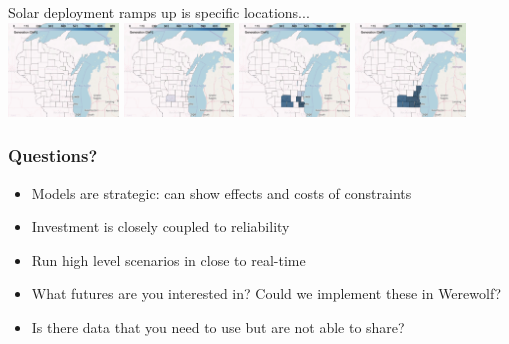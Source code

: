 \documentclass[xcolor=dvipsnames]{beamer}
\begin{document}
\begin{frame}
  Solar deployment ramps up is specific locations... \\
  \includegraphics[width=0.22\textwidth]{includes/no_leakage_maxNR_solar_r0.png}
  \includegraphics[width=0.22\textwidth]{includes/no_leakage_maxNR_solar_r2.png}
  \includegraphics[width=0.22\textwidth]{includes/no_leakage_maxNR_solar_r3.png}
  \includegraphics[width=0.22\textwidth]{includes/no_leakage_maxNR_solar_r4.png}

\end{frame}

\begin{frame}
  \frametitle{Questions?}
  \begin{itemize}
  \item Models are strategic: can show effects and costs of constraints
  \item Investment is closely coupled to reliability
  \item Run high level scenarios in close to real-time
  \item \alert{What futures are you interested in?}   Could we implement these
    in Werewolf?
  \item Is there data that you need to use but are not able to share?
  \end{itemize}
\end{frame}
%
\appendix
\end{document}
